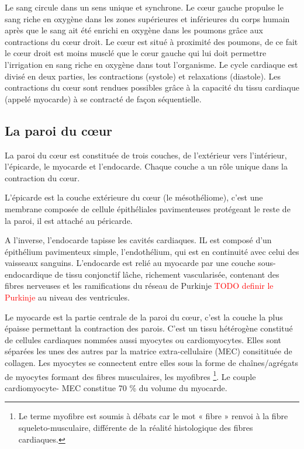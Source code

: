 Le sang circule dans un sens unique et synchrone. Le cœur gauche propulse le sang riche en oxygène dans les zones supérieures et inférieures du corps humain après que le sang ait été enrichi en oxygène dans les poumons grâce aux contractions du cœur droit. Le cœur est situé à proximité des poumons, de ce fait le cœur droit est moins musclé que le cœur gauche qui lui doit permettre l’irrigation en sang riche en oxygène dans tout l’organisme. Le cycle cardiaque est divisé en deux parties, les contractions (systole) et relaxations (diastole). Les contractions du cœur sont rendues possibles grâce à la capacité du tissu cardiaque  (appelé myocarde) à se contracté de façon séquentielle. 

\subsection{La paroi du cœur}
La paroi du cœur est constituée de trois couches, de l’extérieur vers l’intérieur, l’épicarde, le myocarde et l’endocarde. Chaque couche a un rôle unique dans la contraction du cœur.

\begin{bulletList}
\item L’épicarde est la couche extérieure du cœur (le mésothéliome), c’est une membrane composée de cellule épithéliales pavimenteuses protégeant le reste de la paroi, il est attaché au péricarde.

\item A l’inverse, l’endocarde tapisse les cavités cardiaques. IL est composé d'un épithélium pavimenteux simple, l'endothélium, qui est en continuité avec celui des vaisseaux sanguins. L'endocarde est relié au myocarde par une couche sous-endocardique de tissu conjonctif lâche, richement vascularisée, contenant des fibres nerveuses et les ramifications du réseau de Purkinje \textcolor{red}{TODO definir le Purkinje} au niveau des ventricules.

\item Le myocarde est la partie centrale de la paroi du cœur, c’est la couche la plus épaisse permettant la contraction des parois. C’est un tissu hétérogène constitué de cellules cardiaques nommées aussi myocytes ou cardiomyocytes. Elles sont séparées les unes des autres par la matrice extra-cellulaire (MEC) consitituée de collagen. Les myocytes se connectent entre elles sous la forme de chaînes/agrégats de myocytes formant des fibres musculaires, les myofibres \footnote{Le terme myofibre est soumis à débats car le mot « fibre » renvoi à la fibre squeleto-musculaire, différente de la réalité histologique des fibres cardiaques. }. Le couple cardiomyocyte- MEC constitue 70  \% du volume du myocarde. \\
\end{bulletList}

